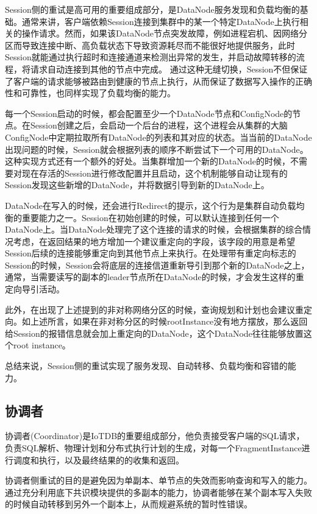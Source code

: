 Session侧的重试是高可用的重要组成部分，是DataNode服务发现和负载均衡的基础。通常来讲，客户端依赖Session连接到集群中的某一个特定DataNode上执行相关的操作请求。然而，如果该DataNode节点突发故障，例如进程宕机、因网络分区而导致连接中断、高负载状态下导致资源耗尽而不能很好地提供服务，此时Session就能通过执行超时和连接通道来检测出异常的发生，并启动故障转移的流程，将请求自动连接到其他的节点中完成。
通过这种无缝切换，Session不但保证了客户端的请求能够被路由到健康的节点上执行，从而保证了数据写入操作的正确性和可靠性，也同样实现了负载均衡的能力。

每一个Session启动的时候，都会配置至少一个DataNode节点和ConfigNode的节点。在Session创建之后，会启动一个后台的进程，这个进程会从集群的大脑ConfigNode中定期拉取所有DataNode的列表和其对应的状态。当当前的DataNode出现问题的时候，Session就会根据列表的顺序不断尝试下一个可用的DataNode。这种实现方式还有一个额外的好处。当集群增加一个新的DataNode的时候，不需要对现在存活的Session进行修改配置并且启动，这个机制能够自动让现有的Session发现这些新增的DataNode，并将数据引导到新的DataNode上。

DataNode在写入的时候，还会进行Redirect的提示，这个行为是集群自动负载均衡的重要能力之一。Session在初始创建的时候，可以默认连接到任何一个DataNode上。当DataNode处理完了这个连接的请求的时候，会根据集群的综合情况考虑，在返回结果的地方增加一个建议重定向的字段，该字段的用意是希望Session后续的连接能够重定向到其他节点上来执行。在处理带有重定向标志的Session的时候，Session会将底层的连接信道重新导引到那个新的DataNode之上，通常，当需要读写的副本的leader节点所在DataNode的时候，才会发生这样的重定向导引活动。

此外，在出现了上述提到的非对称网络分区的时候，查询规划和计划也会建议重定向。如上述所言，如果在非对称分区的时候rootInstance没有地方摆放，那么返回给Session的报错信息就会加上重定向的DataNode，这个DataNode往往能够放置这个root instance。


总结来说，Session侧的重试实现了服务发现、自动转移、负载均衡和容错的能力。



\subsection{协调者}

协调者(Coordinator)是IoTDB的重要组成部分，他负责接受客户端的SQL请求，负责SQL解析、物理计划和分布式执行计划的生成，对每一个FragmentInstance进行调度和执行，以及最终结果的的收集和返回。

协调者侧重试的目的是避免因为单副本、单节点的失效而影响查询和写入的能力。通过充分利用底下共识模块提供的多副本的能力，协调者能够在某个副本写入失败的时候自动转移到另外一个副本上，从而规避系统的暂时性错误。






